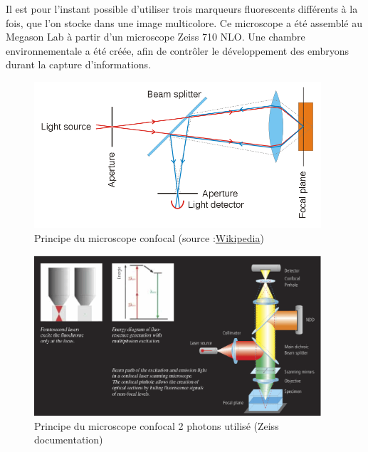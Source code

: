 Il est pour l'instant possible d'utiliser trois marqueurs fluorescents différents à la fois, que l'on stocke dans une image multicolore.
Ce microscope a été assemblé au Megason Lab à partir d'un microscope Zeiss 710 NLO.
Une chambre environnementale a été créée, afin de contrôler le développement des embryons durant la capture d'informations.

\begin{figure}[htb]
\begin{center}
\leavevmode
\includegraphics[width=0.95\textwidth]{pictures/ConfocalPrinciple}
\end{center}
\caption{Principe du microscope confocal (source :\href{http://en.wikipedia.org/wiki/File:Confocalprinciple.svg}{Wikipedia})}
\label{fig:ConfocalPrinciple}
\end{figure}

\begin{figure}[htb]
\begin{center}
\leavevmode
\includegraphics[width=0.95\textwidth]{pictures/ConfocalZeissPrinciple}
\end{center}
\caption{Principe du microscope confocal 2 photons utilisé (Zeiss documentation)}
\label{fig:Confocal2photonsPrinciple}
\end{figure}


